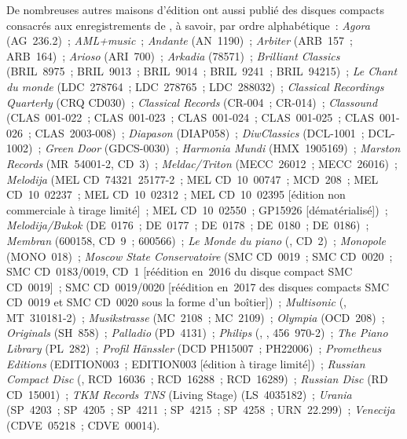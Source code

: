 De nombreuses autres maisons d'édition ont aussi publié des disques compacts
consacrés aux enregistrements de \VSofronitsky{}, à savoir, par ordre
alphabétique~:
\emph{Agora} (AG~236.2)~;
\emph{AML+music}~;
\emph{Andante} (AN~1190)~;
\emph{Arbiter} (ARB~157~; ARB~164)~;
\emph{Arioso} (ARI~700)~;
\emph{Arkadia} (78571)~;
\emph{Brilliant Classics} (BRIL~8975~; BRIL~9013~; BRIL~9014~; BRIL~9241~;
BRIL~94215)~;
\emph{Le Chant du monde} (LDC~278764~; LDC~278765~; LDC~288032)~;
\emph{Classical Recordings Quarterly} (CRQ CD030)~;
\emph{Classical Records} (CR-004~; CR-014)~;
\emph{Classound} (CLAS~001-022~; CLAS~001-023~; CLAS~001-024~;
CLAS~001-025~; CLAS~001-026~; CLAS~2003-008)~;
\emph{Diapason} (DIAP058)~;
\emph{DiwClassics} (DCL-1001~; DCL-1002)~;
\emph{Green Door} (GDCS-0030)~;
\emph{Harmonia Mundi} (HMX~1905169)~;
\emph{Marston Records} (MR~\hbox{54001-2}, CD~3)~;
\emph{Meldac/Triton} (MECC~26012~; MECC~26016)~;
\emph{Melodija} (MEL CD~74321~25177-2~; MEL CD~10~00747~; MCD~208~;
MEL CD~10~02237~; MEL CD~10~02312~; MEL CD~10~02395 [édition non commerciale
à tirage limité]~; MEL CD~10~02550~; GP15926 [dématérialisé])~;
\emph{Melodija/Bukok} (DE~0176~; DE~0177~; DE~0178~; DE~0180~; DE~0186)~;
\emph{Membran} (600158, CD~9~; 600566)~;
\emph{Le Monde du piano} (, CD~2)~;
\emph{Monopole} (MONO~018)~;
\emph{Moscow State Conservatoire} (SMC CD~0019~; SMC CD~0020~; SMC
CD~0183/0019, CD~1 [réédition en~2016 du disque compact SMC CD~0019]~; SMC
CD~0019/0020 [réédition en~2017 des disques compacts SMC CD~0019 et SMC
CD~0020 sous la forme d'un boîtier])~;
\emph{Multisonic} (, MT~310181-2)~;
\emph{Musikstrasse} (MC~2108~; MC~2109)~;
\emph{Olympia} (OCD~208)~;
\emph{Originals} (SH~858)~;
\emph{Palladio} (PD~4131)~;
\emph{Philips} (, ,
456~970-2)~;
\emph{The Piano Library} (PL~282)~;
\emph{Profil Hänssler} (DCD PH15007~; PH22006)~;
\emph{Prometheus Editions} (EDITION003~; EDITION003\OneHalf{} [édition à
tirage limité])~;
\emph{Russian Compact Disc} (, RCD~16036~; RCD~16288~; RCD~16289)~;
\emph{Russian Disc} (RD CD~15001)~;
\emph{TKM Records TNS} (Living Stage) (LS~4035182)~;
\emph{Urania} (SP~4203~; SP~4205~; SP~4211~; SP~4215~; SP~4258~;
URN~22.299)~;
\emph{Venecija} (CDVE~05218~; CDVE~00014).

